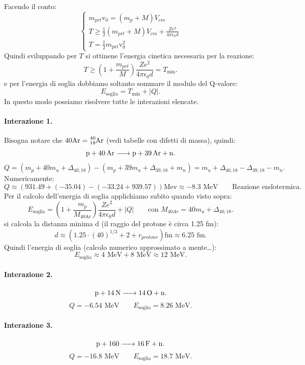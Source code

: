 Facendo il conto:
 \[
\begin{cases}
	m_{prt}\text{v}_0 = \left( m_p + M \right)V_{cm}\\
	T \ge \frac{1}{2}\left( m_{prt} + M \right)V_{cm} + \frac{Ze^2}{4\pi \epsilon_0 d} \\
	T = \frac{1}{2}m_{\text{prt}}\text{v}_0^2
\end{cases}
\]
Quindi sviluppando per $T$ si ottinene l'energia cinetica necessaria per la reazione:
\[
	T \ge \left( 1 + \frac{m_{prt}}{M} \right) \frac{Ze^2}{4\pi \epsilon_0 d} = T_{\text{min}} 
.\] 
e per l'energia di soglia dobbiamo soltanto sommare il modulo del Q-valore:
\[
	E_{\text{soglia}} = T_{\text{min}} + \left| Q \right| 
.\] 
In questo modo possiamo risolvere tutte le interazioni elencate.

\paragraph{Interazione 1.}
Bisogna notare che $40 \text{Ar} = \ce{^{40}_{18}\text{Ar}}$ (vedi tabelle con difetti di massa), quindi:
\[
	\ce{p + 40\text{Ar} -> p + 39\text{Ar} + n}
.\] 
\[
	Q = \left( m_p + 40m_u + \Delta_{40, 18} \right) - \left( m_p + 39 m_u + \Delta_{39, 18} + m_n  \right) = m_u + \Delta_{40, 18} - \Delta_{39, 18} - m_n      
.\]
Numericamente:
\[
	Q \approx \left( 931.49 + \left( -35.04 \right) - \left( -33.24 + 939.57 \right)  \right)\text{Mev} \approx -8.3 \text{ MeV} \quad \quad \text{Reazione endotermica}
.\]
Per il calcolo dell'energia di soglia applichiamo subito quando visto sopra:
\[
	E_{\text{soglia}} = \left( 1 + \frac{m_p}{M_{40\text{Ar}}} \right) \frac{Ze^2}{4 \pi \epsilon_0 d} + \left| Q \right| \quad \quad 
	\text{con } M_{40Ar} = 40m_u + \Delta_{40,18}
.\]
si calcola la distanza minima d (il raggio del protone è circa 1.25 fm): 
\[
	d \approx \left( 1.25 \cdot \left( 40 \right)^{ 1/3 } + 2 + r_{protone} \right)\text{fm} \approx 6.25 \text{ fm} 
.\] 
Quindi l'energia di soglia (calcolo numerico approssimato a mente\ldots):
\[
	E_{\text{soglia}} \approx 4 \text{ MeV} + 8 \text{ MeV} \approx 12 \text{ MeV}   
.\] 
\paragraph{Interazione 2.}%
\[
	\ce{p + 14N -> 14O + n}
.\]
\[
	Q = -6.54 \text{ MeV} \quad \quad E_{\text{soglia}}=8.26 \text{ MeV}
.\] 
\paragraph{Interazione 3.}%
\[
	\ce{p + 160 -> 16F + n }
.\] 
\[
	Q = -16.8 \text{ MeV} \quad \quad E_{\text{soglia}}=18.7 \text{ MeV}
.\] 
